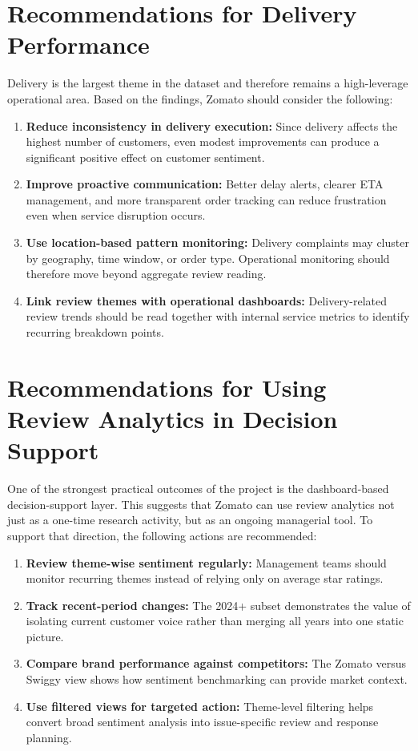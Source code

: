 \section{Recommendations for Delivery Performance}

Delivery is the largest theme in the dataset and therefore remains a high-leverage operational area. Based on the findings, Zomato should consider the following:

\begin{enumerate}[label=\arabic*.]
    \item \textbf{Reduce inconsistency in delivery execution:} Since delivery affects the highest number of customers, even modest improvements can produce a significant positive effect on customer sentiment.
    \item \textbf{Improve proactive communication:} Better delay alerts, clearer ETA management, and more transparent order tracking can reduce frustration even when service disruption occurs.
    \item \textbf{Use location-based pattern monitoring:} Delivery complaints may cluster by geography, time window, or order type. Operational monitoring should therefore move beyond aggregate review reading.
    \item \textbf{Link review themes with operational dashboards:} Delivery-related review trends should be read together with internal service metrics to identify recurring breakdown points.
\end{enumerate}

\section{Recommendations for Using Review Analytics in Decision Support}

One of the strongest practical outcomes of the project is the dashboard-based decision-support layer. This suggests that Zomato can use review analytics not just as a one-time research activity, but as an ongoing managerial tool. To support that direction, the following actions are recommended:

\begin{enumerate}[label=\arabic*.]
    \item \textbf{Review theme-wise sentiment regularly:} Management teams should monitor recurring themes instead of relying only on average star ratings.
    \item \textbf{Track recent-period changes:} The 2024+ subset demonstrates the value of isolating current customer voice rather than merging all years into one static picture.
    \item \textbf{Compare brand performance against competitors:} The Zomato versus Swiggy view shows how sentiment benchmarking can provide market context.
    \item \textbf{Use filtered views for targeted action:} Theme-level filtering helps convert broad sentiment analysis into issue-specific review and response planning.
\end{enumerate}

